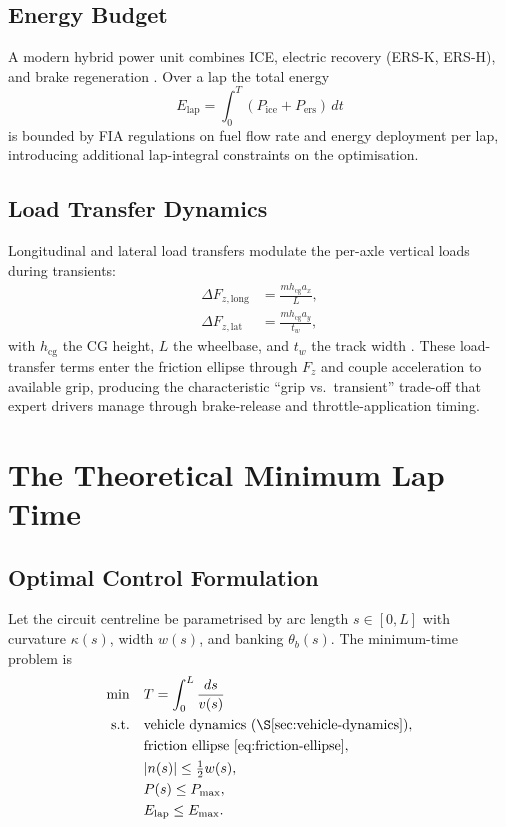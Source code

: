 \documentclass[11pt,twocolumn]{article}
\theoremstyle{definition}
\theoremstyle{remark}
\begin{document}
\subsection{Energy Budget}

A modern hybrid power unit combines ICE, electric recovery (ERS-K, ERS-H), and brake regeneration \cite{heywood2018internal,stone1999introduction,larminie2012electric,ehsani2018modern}. Over a lap the total energy
\begin{equation}
E_{\mathrm{lap}} = \int_0^T (P_{\mathrm{ice}} + P_{\mathrm{ers}})\,dt
\end{equation}
is bounded by FIA regulations \cite{fia2023technical} on fuel flow rate and energy deployment per lap, introducing additional lap-integral constraints on the optimisation.

\subsection{Load Transfer Dynamics}

Longitudinal and lateral load transfers modulate the per-axle vertical loads during transients:
\begin{align}
\Delta F_{z,\mathrm{long}} &= \frac{m h_{\mathrm{cg}} a_x}{L},\\
\Delta F_{z,\mathrm{lat}} &= \frac{m h_{\mathrm{cg}} a_y}{t_w},
\end{align}
with $h_{\mathrm{cg}}$ the CG height, $L$ the wheelbase, and $t_w$ the track width \cite{milliken1995race,genta1997motor,wong2008theory}. These load-transfer terms enter the friction ellipse through $F_z$ and couple acceleration to available grip, producing the characteristic ``grip vs.\ transient'' trade-off that expert drivers manage through brake-release and throttle-application timing.

\section{The Theoretical Minimum Lap Time}
\label{sec:tml}

\subsection{Optimal Control Formulation}

Let the circuit centreline be parametrised by arc length $s \in [0, L]$ with curvature $\kappa(s)$, width $w(s)$, and banking $\theta_b(s)$. The minimum-time problem \cite{casanova2000minimum,perantoni2014optimal,limebeer2015optimal,tremlett2015minimum,velenis2008minimum,kelly2008controlvehicle} is
\begin{align}
\min \quad & T = \int_0^L \frac{ds}{v(s)}\\
\text{s.t.} \quad & \text{vehicle dynamics (\S\ref{sec:vehicle-dynamics})}, \notag\\
& \text{friction ellipse \eqref{eq:friction-ellipse}}, \notag\\
& |n(s)| \le \tfrac{1}{2}w(s), \notag\\
& P(s) \le P_{\max}, \notag\\
& E_{\mathrm{lap}} \le E_{\max}. \notag
\end{align}
\end{document}
